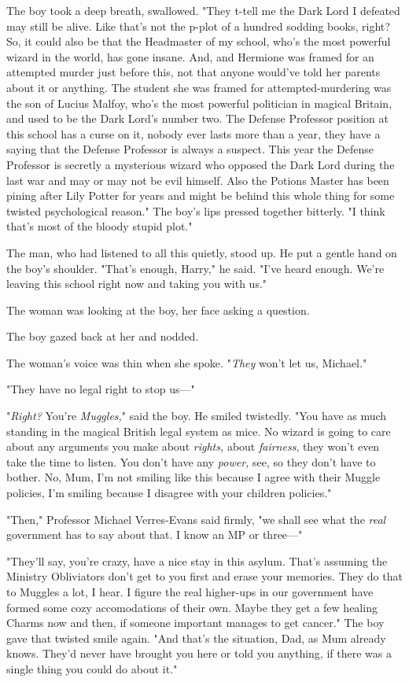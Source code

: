 The boy took a deep breath, swallowed. "They t-tell me the Dark Lord I defeated 
may still be alive. Like that's not the p-plot of a hundred sodding books, 
right? So, it could also be that the Headmaster of my school, who's the most 
powerful wizard in the world, has gone insane. And, and Hermione was framed for 
an attempted murder just before this, not that anyone would've told her parents 
about it or anything. The student she was framed for attempted-murdering was 
the son of Lucius Malfoy, who's the most powerful politician in magical 
Britain, and used to be the Dark Lord's number two. The Defense Professor 
position at this school has a curse on it, nobody ever lasts more than a year, 
they have a saying that the Defense Professor is always a suspect. This year 
the Defense Professor is secretly a mysterious wizard who opposed the Dark Lord 
during the last war and may or may not be evil himself. Also the Potions Master 
has been pining after Lily Potter for years and might be behind this whole 
thing for some twisted psychological reason." The boy's lips pressed together 
bitterly. "I think that's most of the bloody stupid plot."

The man, who had listened to all this quietly, stood up. He put a gentle hand 
on the boy's shoulder. "That's enough, Harry," he said. "I've heard enough. 
We're leaving this school right now and taking you with us."

The woman was looking at the boy, her face asking a question.

The boy gazed back at her and nodded.

The woman's voice was thin when she spoke. "\emph{They} won't let us, Michael."

"They have no legal right to stop us---"

"\emph{Right?} You're \emph{Muggles,}" said the boy. He smiled twistedly. "You 
have as much standing in the magical British legal system as mice. No wizard is 
going to care about any arguments you make about \emph{rights,} about 
\emph{fairness}, they won't even take the time to listen. You don't have any 
\emph{power,} see, so they don't have to bother. No, Mum, I'm not smiling like 
this because I agree with their Muggle policies, I'm smiling because I disagree 
with your children policies."

"Then," Professor Michael Verres-Evans said firmly, "we shall see what the 
\emph{real} government has to say about that. I know an MP or three---"

"They'll say, you're crazy, have a nice stay in this asylum. That's assuming 
the Ministry Obliviators don't get to you first and erase your memories. They 
do that to Muggles a lot, I hear. I figure the real higher-ups in our 
government have formed some cozy accomodations of their own. Maybe they get a 
few healing Charms now and then, if someone important manages to get cancer." 
The boy gave that twisted smile again. "And that's the situation, Dad, as Mum 
already knows. They'd never have brought you here or told you anything, if 
there was a single thing you could do about it."

